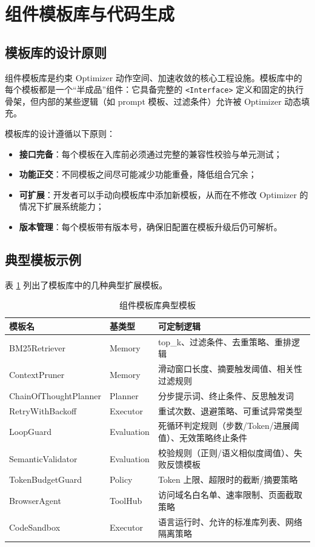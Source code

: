 \section{组件模板库与代码生成}

\subsection{模板库的设计原则}

组件模板库是约束 Optimizer 动作空间、加速收敛的核心工程设施。模板库中的每个模板都是一个“半成品”组件：它具备完整的 \texttt{<Interface>} 定义和固定的执行骨架，但内部的某些逻辑（如 prompt 模板、过滤条件）允许被 Optimizer 动态填充。

模板库的设计遵循以下原则：
\begin{itemize}
    \item \textbf{接口完备}：每个模板在入库前必须通过完整的兼容性校验与单元测试；
    \item \textbf{功能正交}：不同模板之间尽可能减少功能重叠，降低组合冗余；
    \item \textbf{可扩展}：开发者可以手动向模板库中添加新模板，从而在不修改 Optimizer 的情况下扩展系统能力；
    \item \textbf{版本管理}：每个模板带有版本号，确保旧配置在模板升级后仍可解析。
\end{itemize}

\subsection{典型模板示例}

表 \ref{tab:templates} 列出了模板库中的几种典型扩展模板。

\begin{table}[htbp]
\centering
\caption{组件模板库典型模板}
\label{tab:templates}
\begin{tabular}{@{}llp{6.5cm}@{}}
\toprule
\textbf{模板名} & \textbf{基类型} & \textbf{可定制逻辑} \\
\midrule
BM25Retriever & Memory & top\_k、过滤条件、去重策略、重排逻辑 \\
ContextPruner & Memory & 滑动窗口长度、摘要触发阈值、相关性过滤规则 \\
ChainOfThoughtPlanner & Planner & 分步提示词、终止条件、反思触发词 \\
RetryWithBackoff & Executor & 重试次数、退避策略、可重试异常类型 \\
LoopGuard & Evaluation & 死循环判定规则（步数/Token/进展阈值）、无效策略终止条件 \\
SemanticValidator & Evaluation & 校验规则（正则/语义相似度阈值）、失败反馈模板 \\
TokenBudgetGuard & Policy & Token 上限、超限时的截断/摘要策略 \\
BrowserAgent & ToolHub & 访问域名白名单、速率限制、页面截取策略 \\
CodeSandbox & Executor & 语言运行时、允许的标准库列表、网络隔离策略 \\
\bottomrule
\end{tabular}
\end{table}

